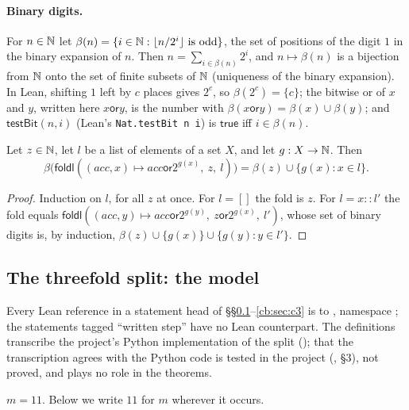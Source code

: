 \paragraph{Binary digits.} For $n\in\mathbb N$ let $\beta(n)=\{i\in\mathbb N:\lfloor n/2^i\rfloor\text{ is odd}\}$, the set of
positions of the digit $1$ in the binary expansion of $n$. Then $n=\sum_{i\in\beta(n)}2^i$, and $n\mapsto\beta(n)$ is a
bijection from $\mathbb N$ onto the set of finite subsets of $\mathbb N$ (uniqueness of the binary expansion). In Lean, shifting $1$
left by $c$ places gives $2^c$, so $\beta(2^c)=\{c\}$; the bitwise or of $x$ and $y$, written here
$x\mathbin{\mathsf{or}}y$, is the number with $\beta(x\mathbin{\mathsf{or}}y)=\beta(x)\cup\beta(y)$; and
$\mathsf{testBit}(n,i)$ (Lean's \texttt{Nat.testBit n i}) is $\mathsf{true}$ iff $i\in\beta(n)$.

\begin{lemma}\label{cb:lem:bits}
Let $z\in\mathbb N$, let $l$ be a list of elements of a set $X$, and let $g:X\to\mathbb N$. Then
\[
\beta\big(\mathsf{foldl}((acc,x)\mapsto acc\mathbin{\mathsf{or}}2^{g(x)},\ z,\ l)\big)=\beta(z)\cup\{g(x):x\in l\}.
\]
\end{lemma}

\begin{proof}
Induction on $l$, for all $z$ at once. For $l=[]$ the fold is $z$. For $l=x\mathbin{::}l'$ the fold equals
$\mathsf{foldl}((acc,y)\mapsto acc\mathbin{\mathsf{or}}2^{g(y)},\ z\mathbin{\mathsf{or}}2^{g(x)},\ l')$, whose set of
binary digits is, by induction, $\beta(z)\cup\{g(x)\}\cup\{g(y):y\in l'\}$.
\end{proof}

\subsection{The threefold split: the model}\label{cb:sec:model}

Every Lean reference in a statement head of \S\S\ref{cb:sec:model}--\ref{cb:sec:c3} is to
, namespace ; the statements tagged ``written step'' have no Lean
counterpart. The definitions transcribe the project's Python implementation of the split
(); that the transcription agrees with the Python code is tested in the project
(, \S3), not proved, and plays no role in the theorems.

\begin{definition}\label{cb:def:m}
$m=11$. Below we write $11$ for $m$ wherever it occurs.
\end{definition}


